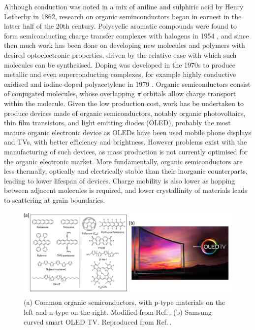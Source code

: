 Although conduction was noted in a mix of aniline and sulphiric acid by Henry Letherby in 1862, research on organic seminconductors began in earnest in the latter half of the 20th century. Polycyclic aromatic compounds were found to form semiconducting charge transfer complexes with halogens in 1954 \cite{Naarmann2002}, and since then much work has been done on developing new molecules and polymers with desired optoelectronic properties, driven by the relative ease with which such molecules can be synthesised. Doping was developed in the 1970s to produce metallic and even superconducting complexes, for example highly conductive oxidised and iodine-doped polyacetylene in 1979 \cite{Shirakawa1977}. Organic semiconductors consist of conjugated molecules, whose overlapping $\pi$ orbitals allow charge transport within the molecule. Given the low production cost, work has be undertaken to produce devices made of organic semiconductors, notably organic photovoltaics, thin film transistors, and light emitting diodes (OLED), probably the most mature organic electronic device as OLEDs have been used mobile phone displays and TVs, with better efficiency and brightness. However problems exist with the manufacturing of such devices, as mass production is not currently optimised for the organic electronic market. More fundamentally, organic semiconductors are less thermally, optically and electrically stable than their inorganic counterparts, leading to lower lifespan of devices. Charge mobility is also lower as hopping between adjacent molecules is required, and lower crystallinity of materials leads to scattering at grain boundaries. 
\begin{figure}[ht]
\centering
\includegraphics[width=\textwidth]{Fig2}
\caption{(a) Common organic semiconductors, with p-type materials on the left and n-type on the right. Modified from Ref.\,\cite{Miozzo2010}. (b) Samsung curved smart OLED TV. Reproduced from Ref.\,\cite{Samsung}.}
\label{1Fig2}
\end{figure}

